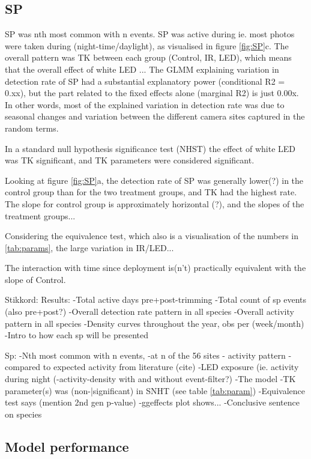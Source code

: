\subsection{SP}

SP was nth most common with n events.
SP was active during 
ie. most photos were taken during (night-time/daylight), as visualised in figure \ref{fig:SP}c.
The overall pattern was TK between each group (Control, IR, LED), which means that the overall effect of white LED ...
The GLMM explaining variation in detection rate of SP had a substantial explanatory power (conditional R2 = 0.xx), but the part related to the fixed effects alone (marginal R2) is just 0.00x.
In other words, most of the explained variation in detection rate was due to seasonal changes and variation between the different camera sites captured in the random terms.

In a standard null hypothesis significance test (NHST) the effect of white LED was TK significant, and TK parameters were considered significant.

Looking at figure \ref{fig:SP}a, the detection rate of SP was generally lower(?) in the control group than for the two treatment groups, and TK had the highest rate.
The slope for control group is approximately horizontal (?), and the slopes of the treatment groups...

Considering the equivalence test, which also is a visualisation of the numbers in \ref{tab:params}, the large variation in IR/LED...

The interaction with time since deployment is(n't) practically equivalent with the slope of Control.



Stikkord:
Results:
	-Total active days pre+post-trimming
	-Total count of sp events (also pre+post?)
-Overall detection rate pattern in all species
-Overall activity pattern in all species
-Density curves throughout the year, obs per (week/month)
-Intro to how each sp will be presented

Sp:
-Nth most common with n events,
	-at n of the 56 sites 
- activity pattern
	-compared to expected activity from literature (cite)
	-LED exposure (ie. activity during night
	(-activity-density with and without event-filter?)
-The model
	-TK parameter(s) was (non-|significant) in SNHT (see table \ref{tab:param})
	-Equivalence test says (mention 2nd gen p-value)
	-ggeffects plot shows...
-Conclusive sentence on species



\subsection{Model performance}

